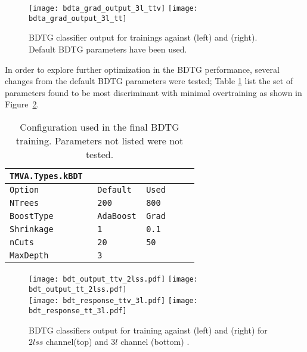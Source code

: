 \begin{figure} [!h]
  \centering
   \texttt{[image: bdta\_grad\_output\_3l\_ttv]}
   \texttt{[image: bdta\_grad\_output\_3l\_tt]}
\caption[BDTG classifier response. Default parameters.]{BDTG classifier output for trainings against \ttV (left) and \ttbar(right). Default BDTG  parameters have been used.}
\label{fig:bdtg_output_default}
\end{figure}

In order to explore further optimization in the BDTG performance, several changes from the default BDTG parameters were tested; Table \ref{tab:bdtsettings} list the set of parameters found to be most discriminant with minimal overtraining as shown in Figure~\ref{fig:output_2lss}.  

\begin{table} [!h]
\centering
\begin{tabular}{lll}\hline
  \verb|TMVA.Types.kBDT                  | \\\hline
  \verb|Option            Default   Used |\\
  \verb|NTrees            200       800  |\\
  \verb|BoostType         AdaBoost  Grad | \\
  \verb|Shrinkage         1         0.1  | \\ 
  \verb|nCuts             20        50   | \\
  \verb|MaxDepth          3              | \\ \hline
\end{tabular}
\caption[Configuration used in the final BDTG training.]{Configuration used in the final BDTG training. Parameters not listed were not tested.}\label{tab:bdtsettings}
\end{table}

\begin{figure} [!h]
  \centering
   \texttt{[image: bdt\_output\_ttv\_2lss.pdf]}
   \texttt{[image: bdt\_output\_tt\_2lss.pdf]}\\
   \texttt{[image: bdt\_response\_ttv\_3l.pdf]}
   \texttt{[image: bdt\_response\_tt\_3l.pdf]}
\caption[BDTG classifier output.]{BDTG classifiers output for training against \ttV (left) and \ttbar(right) for $2lss$ channel(top) and $3l$ channel (bottom) .}
\label{fig:output_2lss}
\end{figure}

